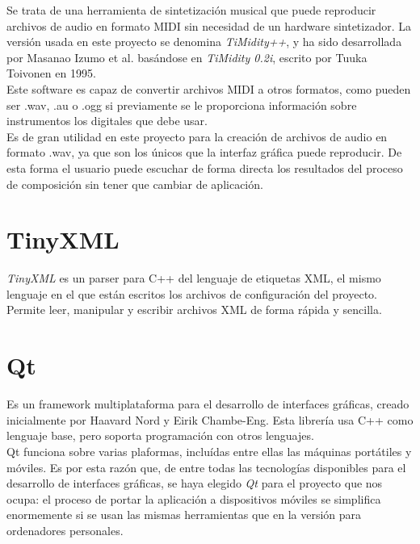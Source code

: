 Se trata de una herramienta de sintetización musical que puede reproducir archivos de audio en formato MIDI sin necesidad de un hardware sintetizador. La versión usada en este proyecto se denomina \emph{TiMidity++}, y ha sido desarrollada por Masanao Izumo et al. basándose en \emph{TiMidity 0.2i}, escrito por Tuuka Toivonen en 1995.\\

Este software es capaz de convertir archivos MIDI a otros formatos, como pueden ser .wav, .au o .ogg si previamente se le proporciona información sobre instrumentos los digitales que debe usar.\\

Es de gran utilidad en este proyecto para la creación de archivos de audio en formato .wav, ya que son los únicos que la interfaz gráfica puede reproducir. De esta forma el usuario puede escuchar de forma directa los resultados del proceso de composición sin tener que cambiar de aplicación.

\section{TinyXML}
\label{sec:TinyXML}

\emph{TinyXML} es un parser para C++ del lenguaje de etiquetas XML, el mismo lenguaje en el que están escritos los archivos de configuración del proyecto. Permite leer, manipular y escribir archivos XML de forma rápida y sencilla.\\

\section{Qt}
\label{sec:Qt}

Es un framework multiplataforma para el desarrollo de interfaces gráficas, creado inicialmente por Haavard Nord y Eirik Chambe-Eng. Esta librería usa C++ como lenguaje base, pero soporta programación con otros lenguajes.\\

Qt funciona sobre varias plaformas, incluídas entre ellas las máquinas portátiles y móviles. Es por esta razón que, de entre todas las tecnologías disponibles para el desarrollo de interfaces gráficas, se haya elegido \emph{Qt} para el proyecto que nos ocupa: el proceso de portar la aplicación a dispositivos móviles se simplifica enormemente si se usan las mismas herramientas que en la versión para ordenadores personales.

